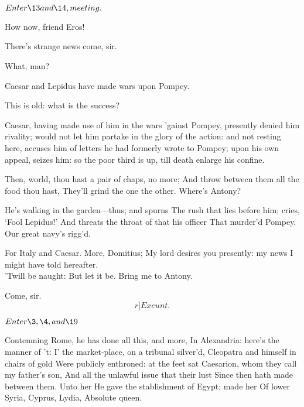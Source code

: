 \documentclass{book}
\begin{document}


	\(Enter \13 and \14, meeting.\)

\begin{PROSE}

	How now, friend Eros!

	There's strange news come, sir.

	What, man?

	Caesar and Lepidus have made wars upon Pompey.

	This is old: what is the success?

	Caesar, having made use of him in the wars 'gainst
	Pompey, presently denied him rivality; would not let
	him partake in the glory of the action: and not
	resting here, accuses him of letters he had formerly
	wrote to Pompey; upon his own appeal, seizes him: so
	the poor third is up, till death enlarge his confine.

	Then, world, thou hast a pair of chaps, no more;
	And throw between them all the food thou hast,
	They'll grind the one the other. Where's Antony?

\end{PROSE}

	He's walking in the garden---thus; and spurns
	The rush that lies before him; cries, `Fool Lepidus!'
	And threats the throat of that his officer
	That murder'd Pompey. \\

	Our great navy's rigg'd.

	For Italy and Caesar. More, Domitius;
	My lord desires you presently: my news
	I might have told hereafter. \\

	'Twill be naught:
	But let it be. Bring me to Antony.

	Come, sir. 	\[r]Exeunt.\]






	\(Enter \3, \4, and \19\)

\3	Contemning Rome, he has done all this, and more,
	In Alexandria: here's the manner of 't:
	I' the market-place, on a tribunal silver'd,
	Cleopatra and himself in chairs of gold
	Were publicly enthroned: at the feet sat
	Caesarion, whom they call my father's son,
	And all the unlawful issue that their lust
	Since then hath made between them. Unto her
	He gave the stablishment of Egypt; made her
	Of lower Syria, Cyprus, Lydia,
	Absolute queen. \\
\end{document}
